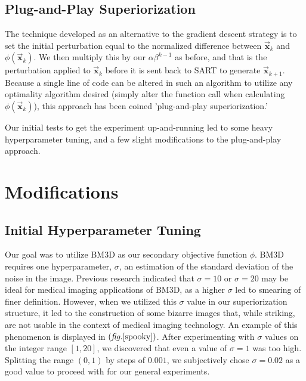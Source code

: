 \documentclass[sigconf,twocolumn,nonacm=true]{acmart}
\newcommand{\tighten}{\vspace*{-6pt plus -2pt minus -2pt}} %
\newcommand{\enc}[1]{\left( #1 \right)} %
\newcommand{\vvec}[1]{\vec{\boldsymbol{#1}}} %
\newcommand{\fig}[1]{$\enc{\textit{fig.}\ref{#1}}$}
\begin{document}
\subsection{Plug-and-Play Superiorization}\tighten
The technique developed as an alternative to the gradient descent strategy is to set the initial perturbation equal to the normalized difference between $\vvec{x}_k$ and $\phi(\vvec{x}_k)$. We then multiply this by our $\alpha\beta^{k-1}$ as before, and that is the perturbation applied to $\vvec{x}_k$ before it is sent back to SART to generate $\vvec{x}_{k+1}$. Because a single line of code can be altered in such an algorithm to utilize any optimality algorithm desired (simply alter the function call when calculating $\phi(\vvec{x}_k)$), this approach has been coined 'plug-and-play superiorization.' \cite{pnp} 

Our initial tests to get the experiment up-and-running led to some heavy hyperparameter tuning, and a few slight modifications to the plug-and-play approach. 

\medskip
\section{Modifications}\tighten
\subsection{Initial Hyperparameter Tuning}\tighten
Our goal was to utilize BM3D as our secondary objective function $\phi$. BM3D requires one hyperparameter, $\sigma$, an estimation of the standard deviation of the noise in the image. Previous research\cite{sheng2014denoised} indicated that $\sigma = 10$ or $\sigma = 20$ may be ideal for medical imaging applications of BM3D, as a higher $\sigma$ led to smearing of finer definition. However, when we utilized this $\sigma$ value in our superiorization structure, it led to the construction of some bizarre images that, while striking, are not usable in the context of medical imaging technology. An example of this phenomenon is displayed in \fig{spooky}. After experimenting with $\sigma$ values on the integer range $[1,20]$, we discovered that even a value of $\sigma=1$ was too high. Splitting the range $(0,1)$ by steps of $0.001$, we subjectively chose $\sigma=0.02$ as a good value to proceed with for our general experiments.
\end{document}
